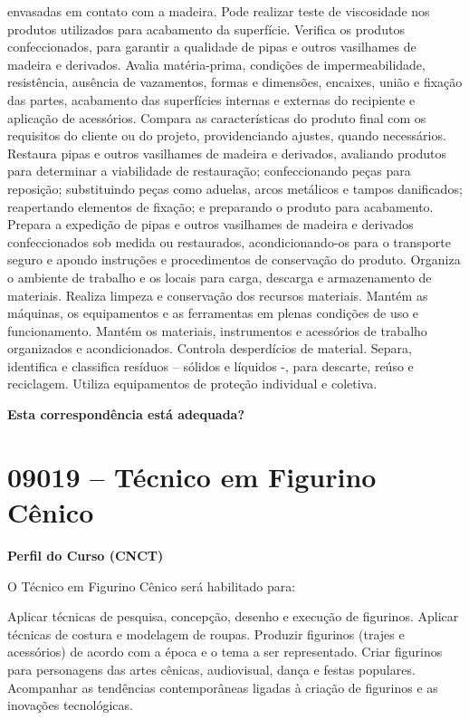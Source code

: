 \documentclass[
]{article}
\begin{document}
envasadas em contato com a madeira. Pode realizar teste de viscosidade
nos produtos utilizados para acabamento da superfície. Verifica os
produtos confeccionados, para garantir a qualidade de pipas e outros
vasilhames de madeira e derivados. Avalia matéria-prima, condições de
impermeabilidade, resistência, ausência de vazamentos, formas e
dimensões, encaixes, união e fixação das partes, acabamento das
superfícies internas e externas do recipiente e aplicação de acessórios.
Compara as características do produto final com os requisitos do cliente
ou do projeto, providenciando ajustes, quando necessários. Restaura
pipas e outros vasilhames de madeira e derivados, avaliando produtos
para determinar a viabilidade de restauração; confeccionando peças para
reposição; substituindo peças como aduelas, arcos metálicos e tampos
danificados; reapertando elementos de fixação; e preparando o produto
para acabamento. Prepara a expedição de pipas e outros vasilhames de
madeira e derivados confeccionados sob medida ou restaurados,
acondicionando-os para o transporte seguro e apondo instruções e
procedimentos de conservação do produto. Organiza o ambiente de trabalho
e os locais para carga, descarga e armazenamento de materiais. Realiza
limpeza e conservação dos recursos materiais. Mantém as máquinas, os
equipamentos e as ferramentas em plenas condições de uso e
funcionamento. Mantém os materiais, instrumentos e acessórios de
trabalho organizados e acondicionados. Controla desperdícios de
material. Separa, identifica e classifica resíduos -- sólidos e líquidos
-, para descarte, reúso e reciclagem. Utiliza equipamentos de proteção
individual e coletiva.

\begin{Form}
\textbf{Esta correspondência está adequada?} \\ 
\end{Form}

\newpage
\section{ 09019 -- Técnico em Figurino Cênico }

\textbf{Perfil do Curso (CNCT)}

O Técnico em Figurino Cênico será habilitado para:

Aplicar técnicas de pesquisa, concepção, desenho e execução de
figurinos. Aplicar técnicas de costura e modelagem de roupas. Produzir
figurinos (trajes e acessórios) de acordo com a época e o tema a ser
representado. Criar figurinos para personagens das artes cênicas,
audiovisual, dança e festas populares. Acompanhar as tendências
contemporâneas ligadas à criação de figurinos e as inovações
tecnológicas.
\end{document}
